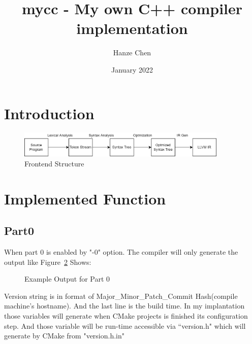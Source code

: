 \documentclass{report}
\title{mycc - My own C++ compiler implementation}
\author{Hanze Chen}
\date{January 2022}
\newcommand{\+}{}
\begin{document}
    \maketitle


    \section{Introduction}\label{sec:introduction}
    \begin{figure}[hb!]
        \centering
        \includegraphics[width=10cm]{figure/frontend_structure}
        \caption{Frontend Structure}
        \label{fig:frontend_structure}
    \end{figure}


    \section{Implemented Function}\label{sec:implemented-function}

    \subsection{Part0}\label{subsec:part0}
    When part 0 is enabled by "-0" option.
    The compiler will only generate the output like Figure~\ref{fig:example_part0_output} Shows: \par
    \begin{figure}[hb!]
        \centering
        \caption{Example Output for Part 0}
        \label{fig:example_part0_output}
    \end{figure}

    Version string is in format of Major\_Minor\_Patch\_Commit Hash(compile machine's hostname). And the last line is
    the build time. In my implantation those variables will generate when CMake projects is finished its configuration
    step. And those variable will be run-time accessible via “version.h" which will generate by CMake from "version.h.in" \par
\end{document}
